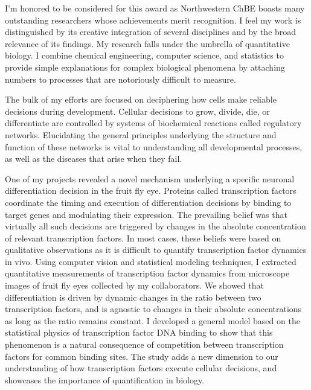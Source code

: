 
I’m honored to be considered for this award as Northwestern ChBE boasts many outstanding researchers whose achievements merit recognition. I feel my work is distinguished by its creative integration of several disciplines and by the broad relevance of its findings. My research falls under the umbrella of quantitative biology. I combine chemical engineering, computer science, and statistics to provide simple explanations for complex biological phenomena by attaching numbers to processes that are notoriously difficult to measure. 

The bulk of my efforts are focused on deciphering how cells make reliable decisions during development. Cellular decisions to grow, divide, die, or differentiate are controlled by systems of biochemical reactions called regulatory networks. Elucidating the general principles underlying the structure and function of these networks is vital to understanding all developmental processes, as well as the diseases that arise when they fail.

One of my projects revealed a novel mechanism underlying a specific neuronal differentiation decision in the fruit fly eye. Proteins called transcription factors coordinate the timing and execution of differentiation decisions by binding to target genes and modulating their expression. The prevailing belief was that virtually all such decisions are triggered by changes in the absolute concentration of relevant transcription factors. In most cases, these beliefs were based on qualitative observations as it is difficult to quantify transcription factor dynamics in vivo. Using computer vision and statistical modeling techniques, I extracted quantitative measurements of transcription factor dynamics from microscope images of fruit fly eyes collected by my collaborators. We showed that differentiation is driven by dynamic changes in the ratio between two transcription factors, and is agnostic to changes in their absolute concentrations as long as the ratio remains constant. I developed a general model based on the statistical physics of transcription factor DNA binding to show that this phenomenon is a natural consequence of competition between transcription factors for common binding sites. The study adds a new dimension to our understanding of how transcription factors execute cellular decisions, and showcases the importance of quantification in biology. 


